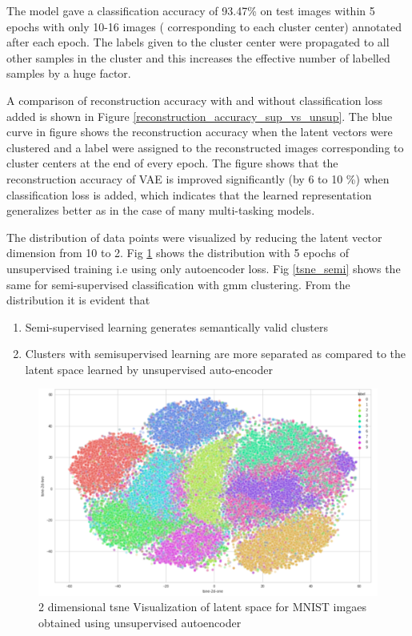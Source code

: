 \documentclass{uai2021} %
\begin{document}
The model gave a classification accuracy of 93.47\% on test images within 5 epochs with only 10-16 images ( corresponding to each  cluster center) annotated after each epoch.
The labels given to the cluster center were propagated to all other samples in the cluster and this increases the effective number of labelled samples by a huge factor.

A comparison of reconstruction accuracy with and without classification loss added is shown in Figure \ref{reconstruction_accuracy_sup_vs_unsup}.
The blue curve in figure shows the reconstruction accuracy when the latent vectors were clustered and a label were assigned to the reconstructed images corresponding to  cluster centers at the end of every epoch.
The figure shows that the reconstruction accuracy of VAE is improved significantly  (by 6 to 10 \%) when classification loss is added, which indicates that the learned representation generalizes better as in the case of many multi-tasking models.

The distribution of data points were visualized by reducing the latent vector dimension from 10 to 2.
Fig \ref{tsne_unsup} shows the distribution with 5 epochs of unsupervised training i.e using only autoencoder loss.
Fig \ref{tsne_semi} shows the same for semi-supervised classification with gmm clustering.
From the distribution it is evident that
\begin{enumerate}
\item Semi-supervised learning generates semantically valid clusters
\item Clusters with semisupervised learning are more separated as compared to the latent space learned by unsupervised auto-encoder
\end{enumerate}

\begin{figure}[]
\centering
\includegraphics[width=\linewidth]{tsne_unsup}
\caption{2 dimensional tsne Visualization of latent space for MNIST imgaes obtained using unsupervised autoencoder }
\label{tsne_unsup}
\end{figure}
\end{document}
